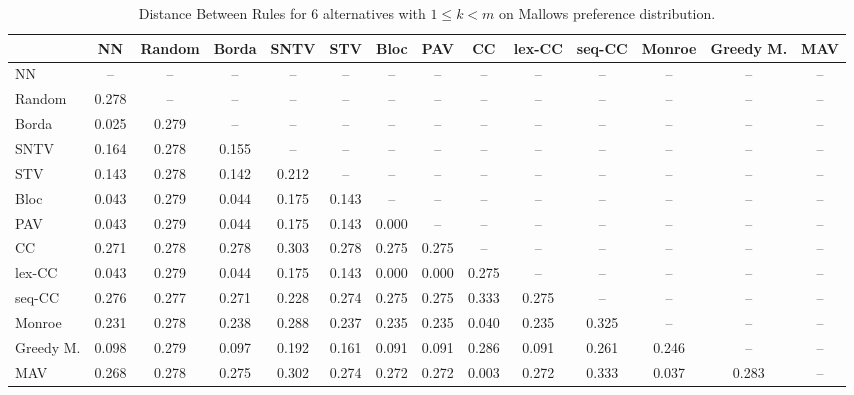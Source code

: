 
\begin{table*}
\centering
\begin{tabular}{lccccccccccccc}
\toprule
 & NN & Random & Borda & SNTV & STV & Bloc & PAV & CC & lex-CC & seq-CC & Monroe & Greedy M. & MAV \\
\midrule
NN & -- & -- & -- & -- & -- & -- & -- & -- & -- & -- & -- & -- & -- \\
Random & 0.278 & -- & -- & -- & -- & -- & -- & -- & -- & -- & -- & -- & -- \\
Borda & 0.025 & 0.279 & -- & -- & -- & -- & -- & -- & -- & -- & -- & -- & -- \\
SNTV & 0.164 & 0.278 & 0.155 & -- & -- & -- & -- & -- & -- & -- & -- & -- & -- \\
STV & 0.143 & 0.278 & 0.142 & 0.212 & -- & -- & -- & -- & -- & -- & -- & -- & -- \\
Bloc & 0.043 & 0.279 & 0.044 & 0.175 & 0.143 & -- & -- & -- & -- & -- & -- & -- & -- \\
PAV & 0.043 & 0.279 & 0.044 & 0.175 & 0.143 & 0.000 & -- & -- & -- & -- & -- & -- & -- \\
CC & 0.271 & 0.278 & 0.278 & 0.303 & 0.278 & 0.275 & 0.275 & -- & -- & -- & -- & -- & -- \\
lex-CC & 0.043 & 0.279 & 0.044 & 0.175 & 0.143 & 0.000 & 0.000 & 0.275 & -- & -- & -- & -- & -- \\
seq-CC & 0.276 & 0.277 & 0.271 & 0.228 & 0.274 & 0.275 & 0.275 & 0.333 & 0.275 & -- & -- & -- & -- \\
Monroe & 0.231 & 0.278 & 0.238 & 0.288 & 0.237 & 0.235 & 0.235 & 0.040 & 0.235 & 0.325 & -- & -- & -- \\
Greedy M. & 0.098 & 0.279 & 0.097 & 0.192 & 0.161 & 0.091 & 0.091 & 0.286 & 0.091 & 0.261 & 0.246 & -- & -- \\
MAV & 0.268 & 0.278 & 0.275 & 0.302 & 0.274 & 0.272 & 0.272 & 0.003 & 0.272 & 0.333 & 0.037 & 0.283 & -- \\
\bottomrule
\end{tabular}

\caption{Distance Between Rules for 6 alternatives with $1 \leq k < m$ on Mallows preference distribution.}
\end{table*}
